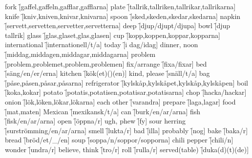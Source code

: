 \begin{questions}
    \begin{multicols}{2}
        \raggedcolumns
        \question fork \f[gaffel,gaffeln,gafflar,gafflarna]
        \question plate \f[tallrik,tallriken,tallrikar,tallrikarna]
        \question knife \f[kniv,kniven,knivar,knivarna]
        \question spoon \f[sked,skeden,skedar,skedarna]
        \question napkin \f[servett,servetten,servetter,servetterna]
        \question deep \f[djup/djupt/djupa]
        \question bowl \f[djup tallrik]
        \question glass \f[glas,glaset,glas,glasen]
        \question cup \f[kopp,koppen,koppar,kopparna]
        \question international \f[internationell/t/a]
        \question today \f[i dag/idag]
        \question dinner, noon \f[middag,middagen,middagar,middagarna]
        \question problem \f[problem,problemet,problem,problemen]
        \question fix/arrange \f[fixa/fixar]
        \question bed \f[säng/en/er/erna]
        \question kitchen \f[kök(et)()(en)]
        \question kind, please \f[snäll/t/a]
        \question bag \f[påse,påsen,påsar,påsarna]
        \question refrigerator \f[kylskåp,kylskåpet,kylskåp,kylskåpen]
        \question boil \f[koka,kokar]
        \question potato \f[potatis,potatisen,potatisar,potatisarna]
        \question chop \f[hacka/hackar]
        \question onion \f[lök,löken,lökar,lökarna]
        \question each other \f[varandra]
        \question prepare \f[laga,lagar]
        \question food \f[mat,maten]
        \question Mexican \f[mexikansk/t/a]
        \question can \f[burk/en/ar/arna]
        \question fish \f[fisk/en/ar/arna]
        \question open \f[öppna/r]
        \question ugh, phew \f[fy]
        \question sour herring \f[surströmming/en/ar/arna]
        \question smell \f[lukta/r]
        \question bad \f[illa]
        \question probably \f[nog]
        \question bake \f[baka/r]
        \question bread \f[bröd/et/\_/en]
        \question soup \f[soppa/n/soppor/sopporna]
        \question chili pepper \f[chili/n]
        \question wonder \f[undra/r]
        \question believe, think \f[tro/r]
        \question roll \f[rulla/r]
        \question served(table) \f[duka(d)(t)(de)]
    \end{multicols}
\end{questions}
